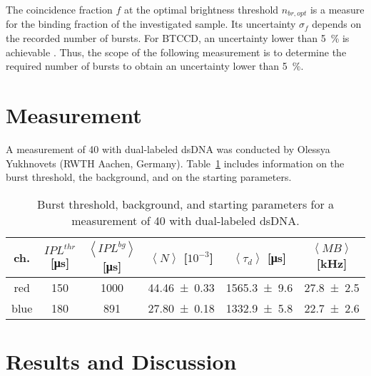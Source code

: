 The coincidence fraction $f$ at the optimal brightness threshold $n_{br,opt}$ is a measure for the binding fraction of the investigated sample. Its uncertainty $\sigma_f$ depends on the recorded number of bursts. For \gls{BTCCD}, an uncertainty lower than \SI{5}{\percent} is achievable \cite{Hoefig2019b}. Thus, the scope of the following measurement is to determine the required number of bursts to obtain an uncertainty lower than \SI{5}{\percent}.

\section{Measurement} \label{Section:OptimalNumberOfBursts_Measurement} 

A measurement of \SI{40}{\min} with dual-labeled \gls{dsDNA} was conducted by Olessya Yukhnovets (RWTH Aachen, Germany). Table~\ref{Table:Measurement_dlDNA_Olessya} includes information on the burst threshold, the background, and on the starting parameters.

\begin{table}[h]
	\centering
	\begin{tabular}{c|c|c|c|c|c} 
		ch. & $IPL^{thr}$ [\si{\micro\second}] & $\left\langle IPL^{bg} \right\rangle$ [\si{\micro\second}] & $\left\langle N \right\rangle$ [$10^{-3}$] & $\left\langle \tau_d \right\rangle$ [\si{\micro\second}] & $\left\langle MB \right\rangle$ [\si{\kilo\hertz}] \\
		\hline
		red & \num{150} & \num{1000} & \num{44.46 +- 0.33} & \num{1565.3 +- 9.6} & \num{27.8 +- 2.5} \\
		blue & \num{180} & \num{891} & \num{27.80 +- 0.18} & \num{1332.9 +- 5.8} & \num{22.7 +- 2.6} \\
	\end{tabular}
	\caption[Burst threshold, background, and starting parameters for measurement of dual-labeled \gls{dsDNA}, conducted by Olessya Yukhnovets (RWTH Aachen, Germany)]{Burst threshold, background, and starting parameters for a measurement of \SI{40}{\min} with dual-labeled \gls{dsDNA}.}
	\label{Table:Measurement_dlDNA_Olessya}
\end{table}

\section{Results and Discussion}

